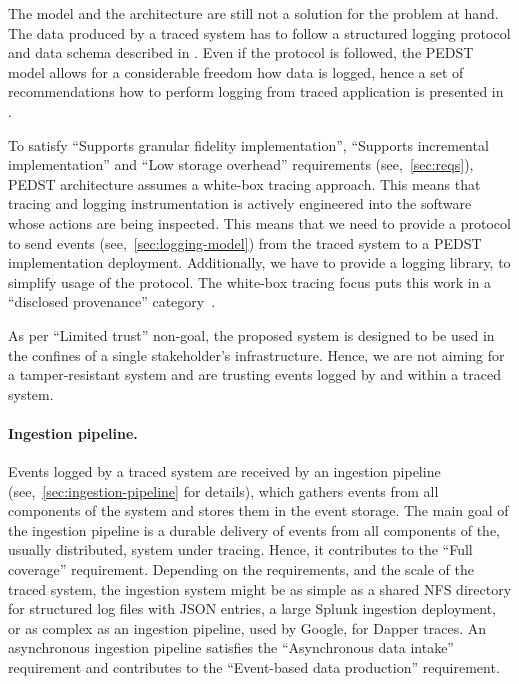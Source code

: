 The model and the architecture are still not a solution for the problem at hand. The data produced by a traced system has to follow a structured logging protocol and data schema described in . Even if the protocol is followed, the PEDST model allows for a considerable freedom how data is logged, hence a set of recommendations how to perform logging from traced application is presented in .

To satisfy ``Supports granular fidelity implementation'', ``Supports incremental implementation'' and ``Low storage overhead'' requirements (see,~\cref{sec:reqs}), PEDST architecture assumes a white-box tracing approach. This means that tracing and logging instrumentation is actively engineered into the software whose actions are being inspected. This means that we need to provide a protocol to send events (see,~\cref{sec:logging-model}) from the traced system to a PEDST implementation deployment. Additionally, we have to provide a logging library, to simplify usage of the protocol. The white-box tracing focus puts this work in a ``disclosed provenance'' category~\cite{braun2006issues}.

As per ``Limited trust'' non-goal, the proposed system is designed to be used in the confines of a single stakeholder’s infrastructure. Hence, we are not aiming for a tamper-resistant system and are trusting events logged by and within a traced system.

\paragraph*{Ingestion pipeline.}

Events logged by a traced system are received by an ingestion pipeline (see,~\cref{sec:ingestion-pipeline} for details), which gathers events from all components of the system and stores them in the event storage. The main goal of the ingestion pipeline is a durable delivery of events from all components of the, usually distributed, system under tracing. Hence, it contributes to the ``Full coverage'' requirement. Depending on the requirements, and the scale of the traced system, the ingestion system might be as simple as a shared NFS directory for structured log files with JSON entries, a large Splunk ingestion deployment, or as complex as an ingestion pipeline, used by Google, for Dapper traces. An asynchronous ingestion pipeline satisfies the ``Asynchronous data intake'' requirement and contributes to the ``Event-based data production'' requirement. 

